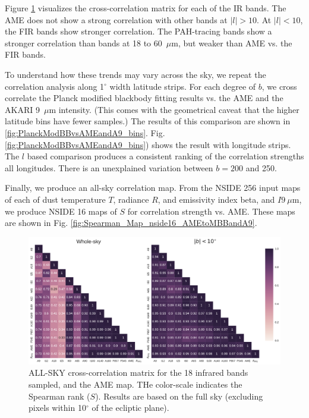      Figure \ref{fig:AME_IR_crosscorr_allbandsg} visualizes the cross-correlation matrix for each of the IR bands. The AME does not show a strong correlation with other bands at $|l|>10$. At $|l|<10$, the FIR bands show stronger correlation. The PAH-tracing bands show a stronger correlation than bands at 18 to 60~$\mu$m, but weaker than AME vs. the FIR bands.

  To understand how these trends may vary across the sky, we repeat the correlation analysis along 1$^{\circ}$ width latitude strips. For each degree of $b$, we cross correlate the Planck modified blackbody fitting results vs. the AME and the AKARI 9~$\mu$m intensity. (This comes with the geometrical caveat that the higher latitude bins have fewer samples.) The results of this comparison are shown in \ref{fig:PlanckModBBvsAMEandA9_bins}. Fig. \ref{fig:PlanckModBBvsAMEandA9_bins}) shows the result with longitude strips. The $l$ based comparison produces a consistent ranking of the correlation strengths all longitudes. There is an unexplained variation between $b = 200$ and 250.

  Finally, we produce an all-sky correlation map. From the NSIDE 256 input maps of each of dust temperature $T$, radiance $R$, and emissivity index beta, and $I 9~\mu$m, we produce NSIDE 16 maps of $S$ for correlation strength vs. AME. These maps are shown in Fig. \ref{fig:Spearman_Map_nside16_AMEtoMBBandA9}.

      \begin{figure}
        \label{fig:AME_IR_crosscorr_allbandsg}
        \includegraphics[width=185mm]{../Plots/all_bands_corr_matrix_wAME_spearman.pdf}
        \centering
        \caption{ALL-SKY cross-correlation matrix for the 18 infrared bands sampled, and the AME map. THe color-scale indicates the Spearman rank ($S$). Results are based on the full sky (excluding pixels within 10$^{\circ}$ of the ecliptic plane).}
      \end{figure}

